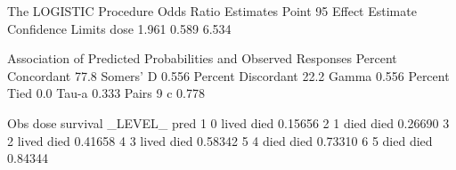 \documentclass{article}
\begin{document}
\begin{Woutput}
The LOGISTIC Procedure
           Odds Ratio Estimates
             Point          95%
Effect    Estimate      Confidence Limits
dose         1.961       0.589       6.534

Association of Predicted Probabilities and Observed Responses
Percent Concordant     77.8    Somers' D    0.556
Percent Discordant     22.2    Gamma        0.556
Percent Tied            0.0    Tau-a        0.333
Pairs                     9    c            0.778

Obs    dose    survival    _LEVEL_      pred
 1       0      lived       died      0.15656
 2       1      died        died      0.26690
 3       2      lived       died      0.41658
 4       3      lived       died      0.58342
 5       4      died        died      0.73310
 6       5      died        died      0.84344
\end{Woutput}
\end{document}
